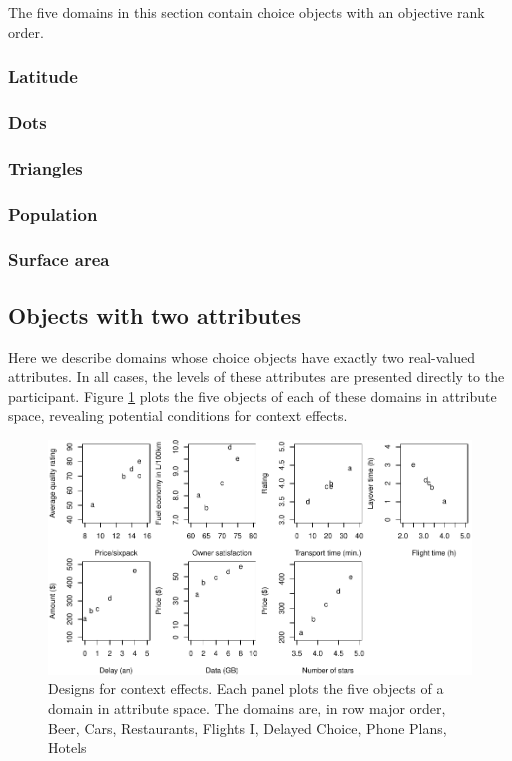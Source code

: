 \documentclass[11pt,letter]{article}
\begin{document}
The five domains in this section contain choice objects with an objective rank order.

\subsubsection{Latitude}



\subsubsection{Dots}



\subsubsection{Triangles}



\subsubsection{Population}



\subsubsection{Surface area}



\subsection{Objects with two attributes}

Here we describe domains whose choice objects have exactly two real-valued attributes.
In all cases, the levels of these attributes are presented directly to the participant.
Figure \ref{f:CE} plots the five objects of each of these domains in attribute space, revealing potential conditions for context effects.

\begin{figure}
	\caption{Designs for context effects. Each panel plots the five objects of a domain in attribute space. The domains are, in row major order, Beer, Cars, Restaurants, Flights I, Delayed Choice, Phone Plans, Hotels}\label{f:CE}
	\centering
	\includegraphics[width=15cm]{design_patterns.pdf}
\end{figure}
\end{document}
